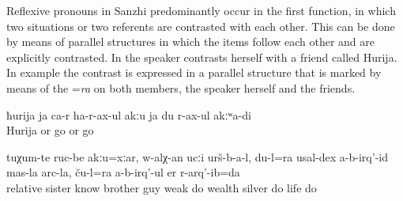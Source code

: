 Reflexive pronouns in Sanzhi predominantly occur in the first function, in which two situations or two referents are contrasted with each other. This can be done by means of parallel structures in which the items follow each other and are explicitly contrasted. In  the speaker contrasts herself with a friend called Hurija. In example  the contrast is expressed in a parallel structure that is marked by means of the  =\textit{ra} on both members, the speaker herself and the friends.
%
\begin{exe}
	\ex	\label{ex:Neither Xurija herself comes (to me) nor do I go (to her)@3c}
	\gll	ħurija	ja	ca-r	ha-r-ax-ul	akːu	ja	du	r-ax-ul	akːʷa-di\\
		Hurija	or		go		or		go	\\
	\glt	{}

	\ex	\label{ex:‎Although there were no brothers (relatives) and sisters@6b}
	\gll	tuχum-te	ruc-be	akːu=xːar,	w-alχ-an	ucːi	urš-b-a-l,	du-l=ra usal-dex	a-b-irq'-id	mas-la	arc-la, ču-l=ra	a-b-irq'-ul	er	r-arq'-ib=da\\
		relative	sister		know	brother	guy		weak	do	wealth\tsc{-gen}	silver		do	life	do\\
	\glt	{}
\end{exe}

